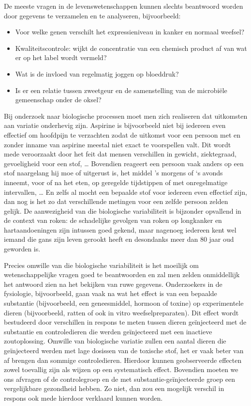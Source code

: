 \documentclass[
  12pt,dutch,coursenotes]{book}
\providecommand{\tightlist}{%
  \setlength{\itemsep}{0pt}\setlength{\parskip}{0pt}}
\theoremstyle{definition}
\theoremstyle{definition}
\theoremstyle{definition}
\theoremstyle{remark}
\begin{document}
De meeste vragen in de levenswetenschappen kunnen slechts beantwoord worden door gegevens te verzamelen en te analyseren, bijvoorbeeld:

\begin{itemize}
\tightlist
\item
  Voor welke genen verschilt het expressieniveau in kanker en normaal weefsel?
\item
  Kwaliteitscontrole: wijkt de concentratie van een chemisch product af van wat er op het label wordt vermeld?\\
\item
  Wat is de invloed van regelmatig joggen op bloeddruk?
\item
  Is er een relatie tussen zweetgeur en de samenstelling van de microbiële gemeenschap onder de oksel?
\end{itemize}

Bij onderzoek naar biologische processen moet men zich realiseren dat uitkomsten aan variatie onderhevig zijn. Aspirine is bijvoorbeeld niet bij iedereen even effectief om hoofdpijn te verzachten zodat de uitkomst voor een persoon met en zonder inname van aspirine meestal niet exact te voorspellen valt. Dit wordt mede veroorzaakt door het feit dat mensen verschillen in gewicht, ziektegraad, gevoeligheid voor een stof, \ldots{} Bovendien reageert een persoon vaak anders op een stof naargelang hij moe of uitgerust is, het middel 's morgens of `s avonds inneemt, voor of na het eten, op geregelde tijdstippen of met onregelmatige intervallen, \ldots{} En zelfs al mocht een bepaalde stof voor iedereen even effectief zijn, dan nog is het zo dat verschillende metingen voor een zelfde persoon zelden gelijk.
De aanwezigheid van die biologische variabiliteit is bijzonder opvallend in de context van roken: de schadelijke gevolgen van roken op longkanker en hartaandoeningen zijn intussen goed gekend, maar nagenoeg iedereen kent wel iemand die gans zijn leven gerookt heeft en desondanks meer dan 80 jaar oud geworden is.

Precies omwille van die biologische variabiliteit is het moeilijk om wetenschappelijke vragen goed te beantwoorden en zal men zelden onmiddellijk het antwoord zien na het bekijken van ruwe gegevens. Onderzoekers in de fysiologie, bijvoorbeeld, gaan vaak na wat het effect is van een bepaalde substantie (bijvoorbeeld, een geneesmiddel, hormoon of toxine) op experimentele dieren (bijvoorbeeld, ratten of ook in vitro weefselpreparaten). Dit effect wordt bestudeerd door verschillen in respons te meten tussen dieren geïnjecteerd met de substantie en controledieren die werden geïnjecteerd met een inactieve zoutoplossing. Omwille van biologische variatie zullen een aantal dieren die geïnjecteerd werden met lage dosissen van de toxische stof, het er vaak beter van af brengen dan sommige controledieren. Hierdoor kunnen geobserveerde effecten zowel toevallig zijn als wijzen op een systematisch effect. Bovendien moeten we ons afvragen of de controlegroep en de met substantie-geïnjecteerde groep een vergelijkbare gezondheid hebben. Zo niet, dan zou een mogelijk verschil in respons ook mede hierdoor verklaard kunnen worden.
\end{document}

